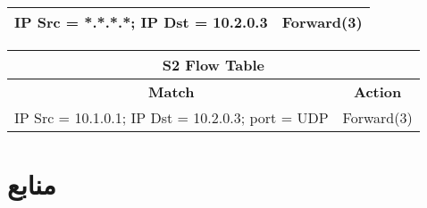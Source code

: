 \documentclass{article}
\begin{document}
\begin{latin}
\begin{table}[H]
\begin{tabular}{|cl|}
\multicolumn{1}{|l|}{IP Src = *.*.*.*; IP Dst = 10.2.0.3} & Forward(3)                           \\ \hline
\end{tabular}
\end{table}
\begin{table}[H]
\begin{tabular}{|cl|}
\hline
\multicolumn{2}{|c|}{\textbf{S2 Flow Table}}                                                                  \\ \hline
\multicolumn{1}{|c|}{\textbf{Match}}                                   & \multicolumn{1}{c|}{\textbf{Action}} \\ \hline
\multicolumn{1}{|l|}{IP Src = 10.1.0.1; IP Dst = 10.2.0.3; port = UDP} & Forward(3)                           \\ \hline
\end{tabular}
\end{table}
\end{latin}

\section*{منابع}
\renewcommand{\section}[2]{}%
\begin{thebibliography}{99} %


\begin{LTRitems}

\resetlatinfont

\end{LTRitems}

\end{thebibliography}
\end{document}
